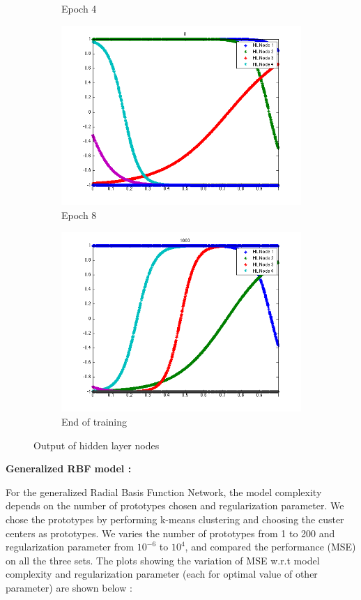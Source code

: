 \documentclass{article}
\begin{document}
\begin{figure}
\begin{subfigure}{.5\textwidth}
  \caption{Epoch 4}
\end{subfigure}%
\begin{subfigure}{.5\textwidth}
  \centering
  \includegraphics[width=.8\linewidth]{Regression/univariate/hiddenLayer_8.png}
   \caption{Epoch 8}
  \end{subfigure}
  
  \begin{subfigure}{0.5\textwidth}
  \centering
  \includegraphics[width=0.8\linewidth]{Regression/univariate/hiddenLayer_1000.png}
   \caption{End of training}
  \end{subfigure}
  
\caption{Output of hidden layer nodes}
\end{figure}

\textbf{Generalized RBF model :}

For the generalized Radial Basis Function Network, the model complexity depends on the number of prototypes chosen and regularization parameter. We chose the prototypes by performing k-means clustering and choosing the custer centers as prototypes. We varies the number of prototypes from 1 to 200 and regularization parameter from $10^{-6}$ to $10^4$, and compared the performance (MSE) on all the three sets. The plots showing the variation of MSE w.r.t model complexity and regularization parameter (each for optimal value of other parameter) are shown below :
\end{document}
